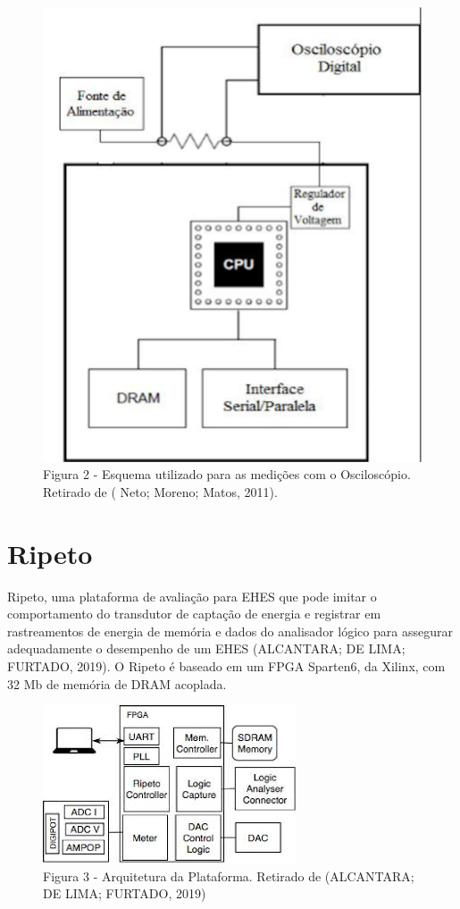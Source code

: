 \begin{figure}[!ht]
\centering
\includegraphics[scale=.65]{figures/ociloscopio.png}
\caption{ Figura 2 - Esquema utilizado para as medições com o Osciloscópio. Retirado de  ( Neto; Moreno; Matos, 2011). } \label{Fig:1}
\end{figure}


\section{Ripeto}
 Ripeto, uma plataforma de avaliação para EHES que pode imitar o comportamento do transdutor de captação de energia e registrar em rastreamentos de energia de memória e dados do analisador lógico para assegurar adequadamente o desempenho de um EHES (ALCANTARA; DE LIMA; FURTADO, 2019). O Ripeto é baseado em um FPGA Sparten6, da Xilinx, com 32 Mb de memória de DRAM acoplada.

\begin{figure}[!ht]
\centering
\includegraphics[scale=.65]{figures/ripeto.png}
\caption{Figura 3 - Arquitetura da Plataforma. Retirado de (ALCANTARA; DE LIMA; FURTADO, 2019) } \label{Fig:1}
\end{figure}

